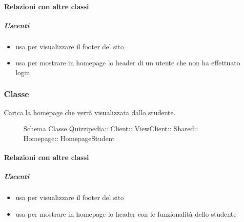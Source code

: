 \paragraph{Relazioni con altre classi}
\subparagraph{Uscenti}
\begin{itemize}
\item usa  per visualizzare il footer del sito
\item usa  per mostrare in homepage lo header di un utente che non ha effettuato login
\end{itemize}
\subsubsection{Classe }
Carica la homepage che verrà visualizzata dallo studente.
\begin{figure}[H]
\centering
\noindent{}
\caption[Schema Classe HomepageStudent]{Schema Classe Quizzipedia:: Client:: ViewClient:: Shared:: Homepage:: HomepageStudent}
\end{figure}
\paragraph{Relazioni con altre classi}
\subparagraph{Uscenti}
\begin{itemize}
\item usa  per visualizzare il footer del sito
\item usa  per mostrare in homepage lo header con le funzionalità dello studente
\end{itemize}
